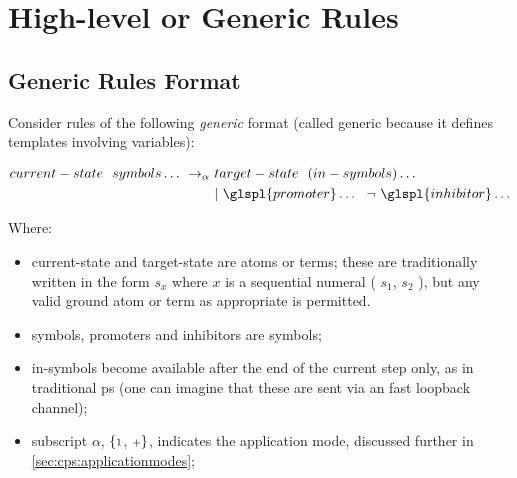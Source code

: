 \section{\label{sec:cps:highlevelrules}High-level or Generic Rules}

\subsection{\label{sec:cps:genericrules}Generic Rules Format}

Consider rules of the following \emph{generic} format 
(called generic because it defines templates involving variables):
\begin{framed}
\vspace{-0.6cm}
\begin{align*}
 current-state  ~~  symbols  \dots ~ \rightarrow_\alpha ~ &  target-state  ~~ ( in-symbols ) \dots ~~ \\
 & | ~  \glspl{promoter} \dots ~~ \neg ~  \glspl{inhibitor} \dots
\end{align*}
\vspace{-0.8cm}
\end{framed}
Where:
\begin{itemize}
\item  current-state  and  target-state  are atoms or terms;  these are traditionally written in the form \(s_x\) where \(x\) is a sequential numeral (\eg{} \(s_1\), \(s_2\) \etc{}), but any valid ground atom or term as appropriate is permitted.

\smallskip
\item  symbols, \glspl{promoter} and \glspl{inhibitor} are symbols;

\smallskip
\item  in-symbols  become available after the end of the current step only, as in traditional \gls{ps}  (one can imagine that these are sent via an \adhoc{} fast  loopback  channel); 

\smallskip
\item subscript \(\alpha\), \(\{{\scriptstyle 1}\), \({\scriptstyle +}\}\), 
indicates the application mode, discussed further in \cref{sec:cps:applicationmodes};
\end{itemize}

